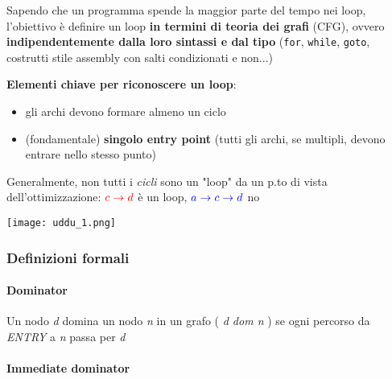 Sapendo che un programma spende la maggior parte del tempo nei loop, l'obiettivo \`e definire un loop \textbf{in termini di teoria dei grafi} (CFG), ovvero \textbf{indipendentemente dalla loro sintassi e dal tipo} (\lstinline|for|, \lstinline|while|, \lstinline|goto|, costrutti stile assembly con salti condizionati e non...)\\

\noindent\begin{minipage}[c]{.45\textwidth}
  \textbf{Elementi chiave per riconoscere un loop}:
  \begin{itemize}
    \item gli archi devono formare almeno un ciclo
    \item (fondamentale) \textbf{singolo entry point} (tutti gli archi, se multipli, devono entrare nello stesso punto)
  \end{itemize}
\end{minipage}\hfill
\begin{minipage}[c]{.5\textwidth}
  \begin{example}[frametitle={}]
    \noindent\begin{minipage}[c]{.7\textwidth}
      Generalmente, non tutti i \textit{cicli} sono un "loop" da un p.to di vista dell'ottimizzazione: $\textcolor{red}{c\rightarrow d}$ \`e un loop, $\textcolor{blue}{a\rightarrow c \rightarrow d}$ no
    \end{minipage}\hfill
    \begin{minipage}[c]{.25\textwidth}
      \texttt{[image: uddu\_1.png]}
    \end{minipage}
  \end{example}
\end{minipage}

\subsubsection{Definizioni formali}

\paragraph{Dominator}

Un nodo \textit{d} domina un nodo \textit{n} in un grafo ( \textit{d dom n} ) se ogni percorso da \textit{ENTRY} a \textit{n} passa per \textit{d}
\paragraph{Immediate dominator}

